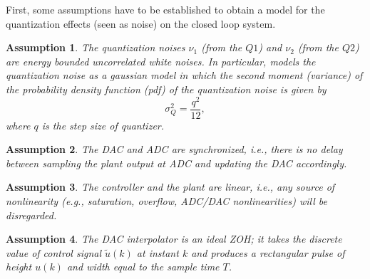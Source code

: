 \documentclass{sig-alternate-05-2015}
\newtheorem{myassumption}{Assumption}
\begin{document}
First, some assumptions have to be established to obtain a model for the
quantization effects (seen as noise) on the closed loop system.
%
\begin{myassumption}
\label{whitenoise}
%
The quantization noises $\nu_{1}$ (from the $Q1$) and $\nu_{2}$ (from the
$Q2$) are energy bounded uncorrelated white noises.
% 
In particular, \cite{widrow1956} models the quantization noise as a gaussian
model in which the second moment (variance) of the probability density
function (pdf) of the quantization noise is given by
%
\begin{equation}
\label{eq:variancelemma}
\sigma_{Q}^{2}=\frac{q^{2}}{12},
\end{equation}
where $q$ is the step size of quantizer. 
\end{myassumption}

\begin{myassumption}
%
The DAC and ADC are synchronized, {\it i.e.}, there is no delay between
sampling the plant output at ADC and updating the DAC accordingly.
%
\end{myassumption}

\begin{myassumption}
%
The controller and the plant are linear, {\it i.e.}, any source of
nonlinearity ({\it e.g.}, saturation, overflow, ADC/DAC nonlinearities) will
be disregarded.
%
\end{myassumption}

\begin{myassumption}
%
The DAC interpolator is an ideal ZOH; it takes the discrete value of control
signal $\tilde u(k)$ at instant $k$ and produces a rectangular pulse of height
$u(k)$ and width equal to the sample time $T$.
%
\end{myassumption}
\end{document}
